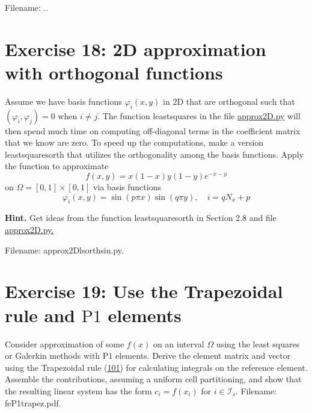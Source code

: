 \documentclass[../main.tex]{subfiles}
\begin{document}
	Filename:  ..
	\bigbreak
	\section*{Exercise 18: 2D approximation with orthogonal functions}
	\label{sec:sec_10_18}
	\noindent Assume we have basis functions $\varphi_{i}(x, y)$ in $2 \mathrm{D}$ that are orthogonal such that $\left(\varphi_{i}, \varphi_{j}\right)=0$ when $i \neq j$. The function least\textunderscore squares in the file \href{http://tinyurl.com/jvzzcfn/fem/fe_approx2D.py}{approx2D.py} will then spend much time on computing off-diagonal terms in the coefficient matrix that we know are zero. To speed up the computations, make a version least\textunderscore squares\textunderscore orth that utilizes the orthogonality among the basis functions. Apply the function to approximate
	$$
	f(x, y)=x(1-x) y(1-y) e^{-x-y}
	$$
	on $\Omega=[0,1] \times[0,1]$ via basis functions
	$$
	\varphi_{i}(x, y)=\sin (p \pi x) \sin (q \pi y), \quad i=q N_{x}+p
	$$
	
	\noindent \textbf{Hint.} Get ideas from the function least\textunderscore squares\textunderscore orth in Section 2.8 and
	file \href{http://tinyurl.com/jvzzcfn/fem/fe_approx2D.py}{approx2D.py.}
	
	Filename: approx2D\textunderscore lsorth\textunderscore sin.py.
	\bigbreak
	\section*{Exercise 19: Use the Trapezoidal rule and $\mathrm{P} 1$ elements}
	\label{sec:sec_10_19}
	\noindent Consider approximation of some $f(x)$ on an interval $\Omega$ using the least squares or Galerkin methods with $\mathrm{P} 1$ elements. Derive the element matrix and vector using the Trapezoidal rule (\hyperref[eqa101]{101}) for calculating integrals on the reference element. Assemble the contributions, assuming a uniform cell partitioning, and show that the resulting linear system has the form $c_{i}=f\left(x_{i}\right)$ for $i \in \mathcal{I}_{s}$. Filename: fe\textunderscore P1\textunderscore trapez.pdf.
	\bigbreak
\end{document}
